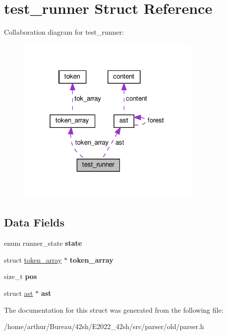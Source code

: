 \hypertarget{structtest__runner}{}\section{test\+\_\+runner Struct Reference}
\label{structtest__runner}


Collaboration diagram for test\+\_\+runner\+:
\nopagebreak
\begin{figure}[H]
\begin{center}
\leavevmode
\includegraphics[width=253pt]{structtest__runner__coll__graph}
\end{center}
\end{figure}
\subsection*{Data Fields}
\begin{DoxyCompactItemize}
\item 
\mbox{\label{structtest__runner_af51cf4b52a9376c21cbf25c7e5dfd3d4}} 
enum runner\+\_\+state {\bfseries state}
\item 
\mbox{\label{structtest__runner_ae25d398062cc1ec82c103ede9ceaf74e}} 
struct \hyperlink{structtoken__array}{token\+\_\+array} $\ast$ {\bfseries token\+\_\+array}
\item 
\mbox{\label{structtest__runner_a5438a597ee291f523ae04a9fe355924f}} 
size\+\_\+t {\bfseries pos}
\item 
\mbox{\label{structtest__runner_a6f86583d363dbc890ff3408ea74d7c15}} 
struct \hyperlink{structast}{ast} $\ast$ {\bfseries ast}
\end{DoxyCompactItemize}


The documentation for this struct was generated from the following file\+:\begin{DoxyCompactItemize}
\item 
/home/arthur/\+Bureau/42sh/\+E2022\+\_\+42sh/src/parser/old/parser.\+h\end{DoxyCompactItemize}
